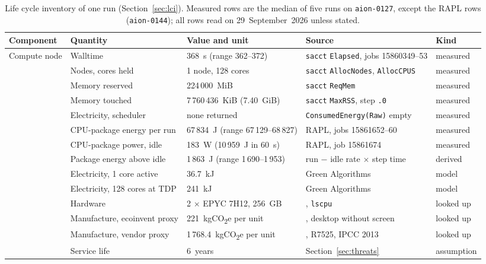 \documentclass[conference,a4paper]{IEEEtran}
\begin{document}
\begin{table}[!t]
\caption{Life cycle inventory of one run (Section~\ref{sec:lci}). Measured
rows are the median of five runs on \texttt{aion-0127}, except the RAPL rows
(\texttt{aion-0144}); all rows read on 29~September~2026 unless stated.}
\label{tab:inventory}
\centering\footnotesize\setlength{\tabcolsep}{4pt}
\begin{tabular}{@{}lllll@{}}
\toprule
Component & Quantity & Value and unit & Source & Kind \\
\midrule
Compute node & Walltime & 368~s (range 362--372) & \texttt{sacct} \texttt{Elapsed}, jobs 15860349--53 & measured \\
             & Nodes, cores held & 1 node, 128 cores & \texttt{sacct} \texttt{AllocNodes}, \texttt{AllocCPUS} & measured \\
             & Memory reserved & 224\,000~MiB & \texttt{sacct} \texttt{ReqMem} & measured \\
             & Memory touched & 7\,760\,436~KiB (7.40~GiB) & \texttt{sacct} \texttt{MaxRSS}, step \texttt{.0} & measured \\
             & Electricity, scheduler & none returned & \texttt{ConsumedEnergy(Raw)} empty & measured \\
             & CPU-package energy per run & 67\,834~J (range 67\,129--68\,827) & RAPL, jobs 15861652--60 & measured \\
             & CPU-package power, idle & 183~W (10\,959~J in 60~s) & RAPL, job 15861674 & measured \\
             & Package energy above idle & 1\,863~J (range 1\,690--1\,953) & run $-$ idle rate $\times$ step time & derived \\
             & Electricity, 1 core active & 36.7~kJ & Green Algorithms~\cite{lannelongue2021} & model \\
             & Electricity, 128 cores at TDP & 241~kJ & Green Algorithms~\cite{lannelongue2021} & model \\
             & Hardware & 2 $\times$ EPYC 7H12, 256~GB & \cite{ulhpcaion}, \texttt{lscpu} & looked up \\
             & Manufacture, ecoinvent proxy & 221~kgCO\textsubscript{2}e per unit & \cite{ecoinvent311}, desktop without screen & looked up \\
             & Manufacture, vendor proxy & 1\,768.4~kgCO\textsubscript{2}e per unit & \cite{dellr7525}, R7525, IPCC 2013 & looked up \\
             & Service life & 6~years & Section~\ref{sec:threats} & assumption \\

\end{tabular}
\end{table}
\end{document}
